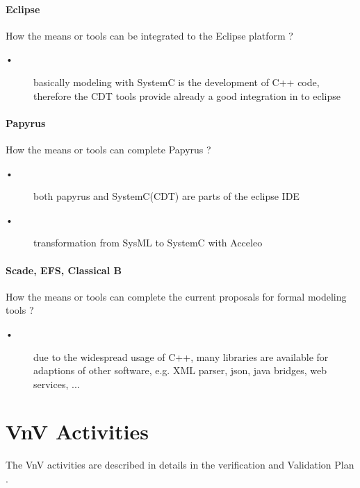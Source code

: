 \paragraph{Eclipse}
How the means or tools can be integrated to the Eclipse platform ?

\begin{author_comment}
\begin{description}
\item [•] basically modeling with SystemC is the development of C++ code, therefore the CDT tools provide already a good integration in to eclipse
\end{description}
\end{author_comment}

\paragraph{Papyrus}
How the means or tools can complete  Papyrus ?

\begin{author_comment}
\begin{description}
\item [•] both papyrus and SystemC(CDT) are parts of the eclipse IDE
\item [•] transformation from SysML to SystemC with Acceleo
\end{description}
\end{author_comment}


\paragraph{Scade, EFS, Classical B}
How the means or tools can complete the current proposals for formal modeling tools ?

\begin{author_comment}
\begin{description}
\item [•] due to the widespread usage of C++, many libraries are available for adaptions of other software, e.g. XML parser, json, java bridges, web services, ...
\end{description}
\end{author_comment}

\section{VnV Activities}

The VnV activities are described in details in the verification and Validation Plan  \citep{D4.1}.


